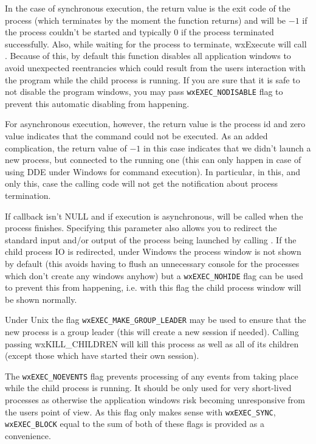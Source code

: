 In the case of synchronous execution, the return value is the exit code of
the process (which terminates by the moment the function returns) and will be
$-1$ if the process couldn't be started and typically 0 if the process
terminated successfully. Also, while waiting for the process to
terminate, wxExecute will call . Because of this, by
default this function disables all application windows to avoid unexpected
reentrancies which could result from the users interaction with the program
while the child process is running. If you are sure that it is safe to not
disable the program windows, you may pass \texttt{wxEXEC\_NODISABLE} flag to
prevent this automatic disabling from happening.

For asynchronous execution, however, the return value is the process id and
zero value indicates that the command could not be executed. As an added
complication, the return value of $-1$ in this case indicates that we didn't
launch a new process, but connected to the running one (this can only happen in
case of using DDE under Windows for command execution). In particular, in this,
and only this, case the calling code will not get the notification about
process termination.

If callback isn't NULL and if execution is asynchronous,
 will be called when
the process finishes. Specifying this parameter also allows you to redirect the
standard input and/or output of the process being launched by calling
. If the child process IO is redirected,
under Windows the process window is not shown by default (this avoids having to
flush an unnecessary console for the processes which don't create any windows
anyhow) but a {\tt wxEXEC\_NOHIDE} flag can be used to prevent this from
happening, i.e. with this flag the child process window will be shown normally.

Under Unix the flag {\tt wxEXEC\_MAKE\_GROUP\_LEADER} may be used to ensure
that the new process is a group leader (this will create a new session if
needed). Calling  passing wxKILL\_CHILDREN will
kill this process as well as all of its children (except those which have
started their own session).

The {\tt wxEXEC\_NOEVENTS} flag prevents processing of any events from taking
place while the child process is running. It should be only used for very
short-lived processes as otherwise the application windows risk becoming
unresponsive from the users point of view. As this flag only makes sense with
{\tt wxEXEC\_SYNC}, {\tt wxEXEC\_BLOCK} equal to the sum of both of these flags
is provided as a convenience.

